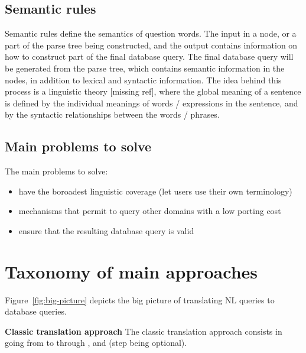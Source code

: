 \documentclass[10pt,journal,letterpaper,compsoc]{IEEEtran}
\begin{document}
\subsection{Semantic rules}
\label{sec:anatomy-semantic-rules}
Semantic rules define the semantics of question words. The input in a node, or a
part of the parse tree being constructed, and the output contains information on
how to construct part of the final database query. The final database query will
be generated from the parse tree, which contains semantic information in the
nodes, in addition to lexical and syntactic information. 
The idea behind this process is a linguistic theory [missing ref], where the
global meaning of a sentence is defined by the individual meanings of words /
expressions in the sentence, and by the syntactic relationships between the
words / phrases. 




\subsection{Main problems to solve}
The main problems to solve:
\begin{itemize}
  \item have the boroadest linguistic coverage (let users use their own
  terminology)
  \item mechanisms that permit to query other domains with a low porting cost
  \item ensure that the resulting database query is valid
\end{itemize}









\section{Taxonomy of main approaches}
\label{sec:overview}

Figure~\ref{fig:big-picture} depicts the big picture of translating NL queries
to database queries.

\textbf{Classic translation approach}
The classic translation approach consists in going from
to  through
 ,
and 
 (step
 being optional).
\end{document}
